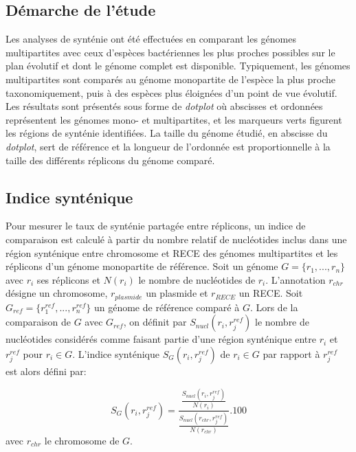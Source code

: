 \subsection{Démarche de l'étude}   
		Les analyses de synténie ont été effectuées en comparant les génomes multipartites avec ceux d'espèces bactériennes les plus proches possibles sur le plan évolutif et dont le génome complet est disponible. Typiquement, les génomes multipartites sont comparés au génome monopartite de l'espèce la plus proche taxonomiquement, puis à des espèces plus éloignées d'un point de vue évolutif. Les résultats sont présentés sous forme de \textit{dotplot} où abscisses et ordonnées représentent les génomes mono- et multipartites, et les marqueurs verts figurent les régions de synténie identifiées. La taille du génome étudié, en abscisse du \textit{dotplot}, sert de référence et la longueur de l'ordonnée est proportionnelle à la taille des différents réplicons du génome comparé.
   
\subsection{Indice synténique}
		Pour mesurer le taux de synténie partagée entre réplicons, un indice de comparaison est calculé à partir du nombre relatif de nucléotides inclus dans une région synténique entre chromosome et RECE des génomes multipartites et les réplicons d'un génome monopartite de référence. 
		Soit un génome $G=\{r_{1},...,r_{n}\}$ avec $r_{i}$ ses réplicons et $N(r_{i})$ le nombre de nucléotides de $r_{i}$. L'annotation $r_{chr}$ désigne un chromosome, $r_{plasmide}$ un plasmide et $r_{RECE}$ un RECE. Soit $G_{ref}=\{r^{ref}_{1},...,r^{ref}_{n}\}$ un génome de référence comparé à $G$. Lors de la comparaison de $G$ avec $G_{ref}$, on définit par $S_{nucl}(r_{i},r_{j}^{ref})$ le nombre de nucléotides considérés comme faisant partie d'une région synténique entre $r_{i}$ et $r_{j}^{ref}$ pour $r_{i} \in G$. L'indice synténique $S_{G}(r_{i},r^{ref}_{j})$ de $r_{i} \in G$ par rapport à $r^{ref}_{j}$ est alors défini par:

		\begin{equation}\label{eqsynteny}
			S_{G}(r_{i},r^{ref}_{j})=\frac{\frac{S_{nucl}(r_{i},r_{j}^{ref})}{N(r_{i})}}{\frac{S_{nucl}(r_{chr},r_{j}^{ref})}{N(r_{chr})}} . 100
		\end{equation}
avec $r_{chr}$ le chromosome de $G$. \\

